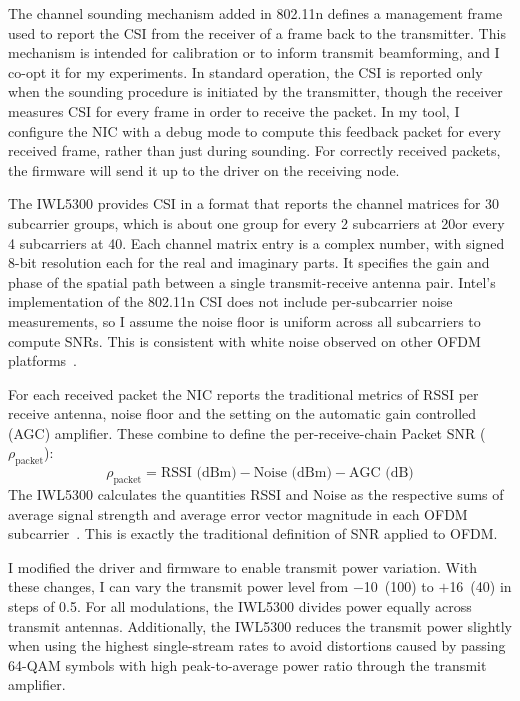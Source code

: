  The channel sounding mechanism added in 802.11n defines a management frame used to report the CSI from the receiver of a frame back to the transmitter. This mechanism is intended for calibration or to inform transmit beamforming, and I co-opt it for my experiments. In standard operation, the CSI is reported only when the sounding procedure is initiated by the transmitter, though the receiver measures CSI for every frame in order to receive the packet. In my tool, I configure the NIC with a debug mode to compute this feedback packet for every received frame, rather than just during sounding. For correctly received packets, the firmware will send it up to the driver on the receiving node.

The IWL5300 provides CSI in a format that reports the channel matrices for 30 subcarrier groups, which is about one group for every 2 subcarriers at 20\MHz or every 4 subcarriers at 40\MHz. Each channel matrix entry is a complex number, with signed 8-bit resolution each for the real and imaginary parts. It specifies the gain and phase of the spatial path between a single transmit-receive antenna pair. Intel's implementation of the 802.11n CSI does not include per-subcarrier noise measurements, so I assume the noise floor is uniform across all subcarriers to compute SNRs. This is consistent with white noise observed on other OFDM platforms~\cite{Rahul_FARA}.

For each received packet the NIC reports the traditional metrics of RSSI per receive antenna, noise floor and the setting on the automatic gain controlled (AGC) amplifier. These combine to define the per-receive-chain Packet SNR ($\rho_{\text{packet}}$):
\begin{equation}
\label{eq:per_chain_snr}
	\rho_{\text{packet}} = \text{RSSI (dBm)} - \text{Noise (dBm)} - \text{AGC (dB)}
\end{equation}
The IWL5300 calculates the quantities RSSI and Noise as the respective sums of average signal strength and average error vector magnitude in each OFDM subcarrier~\cite{iwlwifi}. This is exactly the traditional definition of SNR applied to OFDM.

 I modified the driver and firmware to enable transmit power variation. With these changes, I can vary the transmit power level from $-$10\dBm~(100\uW) to $+$16\dBm~(40\mW) in steps of 0.5\dB. For all modulations, the IWL5300 divides power equally across transmit antennas. Additionally, the IWL5300 reduces the transmit power slightly when using the highest single-stream rates to avoid distortions caused by passing 64-QAM symbols with high peak-to-average power ratio through the transmit amplifier.

